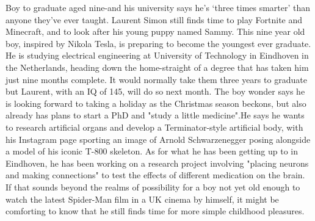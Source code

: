 \documentclass{article}
\begin{document}
\begin{multicols}{2}
Boy to graduate aged nine-and his university says he’s ‘three times smarter’ than anyone they’ve ever taught. Laurent Simon still finds time to play Fortnite and Minecraft, and to look after his young puppy named Sammy. This nine year old boy, inspired by Nikola Tesla, is preparing to become the youngest ever graduate. He is studying electrical engineering at University of Technology in Eindhoven in the Netherlands, heading down the home-straight of a degree that has taken him just nine months complete. It would normally take them three years to graduate but Laurent, with an IQ of 145, will do so next month. The boy wonder says he is looking forward to taking a holiday as the Christmas season beckons, but also already has plans to start a PhD and "study a little medicine".He says he wants to research artificial organs and develop a Terminator-style artificial body, with his Instagram page sporting an image of Arnold Schwarzenegger posing alongside a model of his iconic T-800 skeleton. As for what he has been getting up to in Eindhoven, he has been working on a research project involving "placing neurons and making connections" to test the effects of different medication on the brain. If that sounds beyond the realms of possibility for a boy not yet old enough to watch the latest Spider-Man film in a UK cinema by himself, it might be comforting to know that he still finds time for more simple childhood pleasures.

\pagebreak


\end{multicols}
\end{document}
